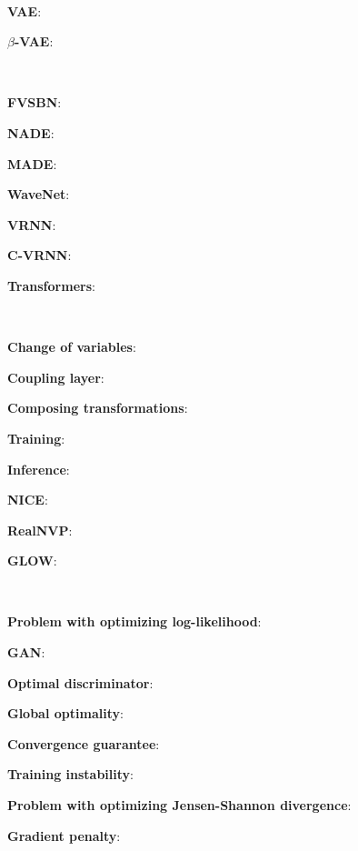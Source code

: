 \documentclass{article}
\newenvironment{topic}[1]
{\textbf{\sffamily \colorbox{black}{\rlap{\textbf{\textcolor{white}{#1}}}\hspace{\linewidth}\hspace{-2\fboxsep}}} \\ \vspace{0.2cm}}
{}
\begin{document}
\begin{multicols*}{2}
\begin{topic}{Autoencoders}
        \textbf{VAE}:

        \textbf{$\beta$-VAE}:

    \end{topic}

    \begin{topic}{Autoregressive models}

        \textbf{FVSBN}:

        \textbf{NADE}:

        \textbf{MADE}:

        \textbf{WaveNet}:

        \textbf{VRNN}:

        \textbf{C-VRNN}:

        \textbf{Transformers}:

    \end{topic}

    \begin{topic}{Normalizing flow}

        \textbf{Change of variables}:

        \textbf{Coupling layer}:

        \textbf{Composing transformations}:

        \textbf{Training}:

        \textbf{Inference}:

        \textbf{NICE}:

        \textbf{RealNVP}:

        \textbf{GLOW}:

    \end{topic}

    \begin{topic}{Generative adversarial network}

        \textbf{Problem with optimizing log-likelihood}:

        \textbf{GAN}:

        \textbf{Optimal discriminator}:

        \textbf{Global optimality}:

        \textbf{Convergence guarantee}:

        \textbf{Training instability}:

        \textbf{Problem with optimizing Jensen-Shannon divergence}:

        \textbf{Gradient penalty}:

    \end{topic}

    \begin{topic}{Diffusion models}


\end{topic}
\end{multicols*}
\end{document}
